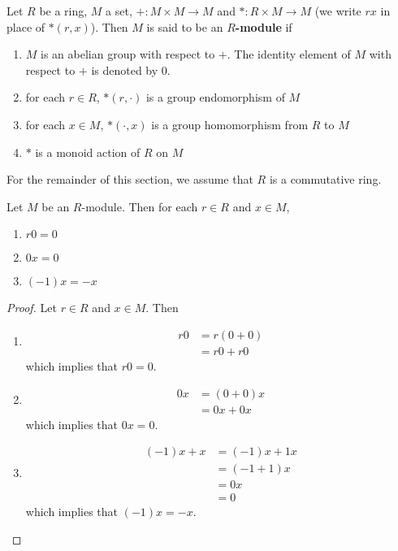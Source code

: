 \documentclass{book}
\begin{document}
	\begin{defn}
	Let $R$ be a ring, $M$ a set, $+: M\times M \rightarrow M$ and $*: R 
	\times M \rightarrow M$ (we write $rx$ in place of 
	$*(r,x)$). Then $M$ is said to be an 
	\textbf{$R$-module}
	if 
	\begin{enumerate}
	\item $M$ is an abelian group with respect to $+$. The identity element of $M$ with respect to $+$ is denoted by 0.
	\item for each $r \in R$, $*(r, \cdot)$ is a group endomorphism of $M$
	\item for each $x \in M$, $*(\cdot, x)$ is a group homomorphism from $R$ to $M$
	\item $*$ is a monoid action of $R$ on $M$
	\end{enumerate}
	\end{defn}
	
	\begin{note}
	For the remainder of this section, we assume that $R$ is a commutative ring. 
	\end{note}
	
	\begin{ex}
	Let $M$ be an $R$-module. Then for each $r \in R$ and $x \in M$, 
	\begin{enumerate}
	\item $r0 = 0$
	\item $0x = 0$
	\item $(-1)x = -x$
	\end{enumerate}
	\end{ex}
	
	\begin{proof} Let $r \in R$ and $x \in M$. Then 
	\begin{enumerate}
	\item 
	\begin{align*}
	r0 
	&= r(0+0) \\
	&= r0 + r0
	\end{align*} 
	which implies that $r0 = 0$.
	\item 
	\begin{align*}
	0x 
	&= (0+0)x \\
	&= 0x + 0x
	\end{align*} 
	which implies that $0x = 0$.
	\item 
	\begin{align*}
	(-1)x + x 
	&= (-1)x + 1x \\ 
	&= (-1 + 1)x \\
	&= 0x \\
	&= 0
	\end{align*}
	which implies that $(-1)x = -x$.
	\end{enumerate}
	\end{proof}
	
\end{document}
